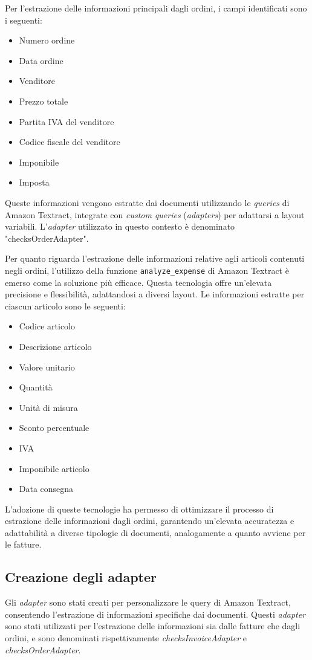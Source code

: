Per l'estrazione delle informazioni principali dagli ordini, i campi identificati sono i seguenti:

\begin{itemize}
    \item Numero ordine
    \item Data ordine
    \item Venditore
    \item Prezzo totale
    \item Partita IVA del venditore
    \item Codice fiscale del venditore
    \item Imponibile
    \item Imposta
\end{itemize}

Queste informazioni vengono estratte dai documenti utilizzando le \textit{queries} di Amazon Textract, integrate con \textit{custom queries} (\textit{adapters}) per adattarsi a layout variabili. L'\textit{adapter} utilizzato in questo contesto è denominato "checksOrderAdapter".

Per quanto riguarda l'estrazione delle informazioni relative agli articoli contenuti negli ordini, l'utilizzo della funzione \texttt{analyze\_expense} di Amazon Textract è emerso come la soluzione più efficace. Questa tecnologia offre un'elevata precisione e flessibilità, adattandosi a diversi layout. Le informazioni estratte per ciascun articolo sono le seguenti:

\begin{itemize}
    \item Codice articolo
    \item Descrizione articolo
    \item Valore unitario
    \item Quantità
    \item Unità di misura
    \item Sconto percentuale
    \item IVA
    \item Imponibile articolo
    \item Data consegna
\end{itemize}

L'adozione di queste tecnologie ha permesso di ottimizzare il processo di estrazione delle informazioni dagli ordini, garantendo un'elevata accuratezza e adattabilità a diverse tipologie di documenti, analogamente a quanto avviene per le fatture.

\subsection{Creazione degli adapter}
Gli \textit{adapter} sono stati creati per personalizzare le query di Amazon Textract, consentendo l'estrazione di informazioni specifiche dai documenti. Questi \textit{adapter} sono stati utilizzati per l'estrazione delle informazioni sia dalle fatture che dagli ordini, e sono denominati rispettivamente \textit{checksInvoiceAdapter} e \textit{checksOrderAdapter}.

